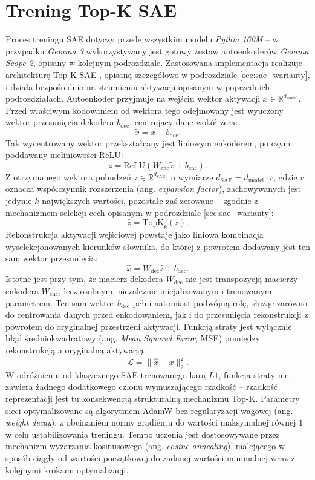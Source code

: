 \section{Trening Top-K SAE}
\label{sec:trening_topk_sae}
Proces treningu SAE dotyczy przede wszystkim modelu \textit{Pythia 160M} -- w przypadku \textit{Gemma 3} wykorzystywany jest gotowy zestaw autoenkoderów \textit{Gemma Scope 2}, opisany w kolejnym podrozdziale. Zastosowana implementacja realizuje architekturę Top-K SAE \cite{gao_2024_scaling_evaluating_sparse_autoencoders}, opisaną szczegółowo w podrozdziale \ref{sec:sae_warianty}, i działa bezpośrednio na strumieniu aktywacji opisanym w poprzednich podrozdziałach. \newline
Autoenkoder przyjmuje na wejściu wektor aktywacji $x \in \mathbb{R}^{d_{\mathrm{model}}}$. Przed właściwym kodowaniem od wektora tego odejmowany jest wyuczony wektor przesunięcia dekodera $b_{\mathrm{dec}}$, centrujący dane wokół zera:
\[
\tilde{x} = x - b_{\mathrm{dec}}.
\]
Tak wycentrowany wektor przekształcany jest liniowym enkoderem, po czym poddawany nieliniowości ReLU:
\[
z = \mathrm{ReLU}(W_{\mathrm{enc}} \tilde{x} + b_{\mathrm{enc}}).
\]
Z otrzymanego wektora pobudzeń $z \in \mathbb{R}^{d_{\mathrm{SAE}}}$, o wymiarze $d_{\mathrm{SAE}} = d_{\mathrm{model}} \cdot r$, gdzie $r$ oznacza współczynnik rozszerzenia (ang. \textit{expansion factor}), zachowywanych jest jedynie $k$ największych wartości, pozostałe zaś zerowane -- zgodnie z mechanizmem selekcji cech opisanym w podrozdziale \ref{sec:sae_warianty}:
\[
\hat{z} = \mathrm{TopK}_k(z).
\]
Rekonstrukcja aktywacji wejściowej powstaje jako liniowa kombinacja wyselekcjonowanych kierunków słownika, do której z powrotem dodawany jest ten sam wektor przesunięcia:
\[
\hat{x} = W_{\mathrm{dec}} \hat{z} + b_{\mathrm{dec}}.
\]
Istotne jest przy tym, że macierz dekodera $W_{\mathrm{dec}}$ nie jest transpozycją macierzy enkodera $W_{\mathrm{enc}}$, lecz osobnym, niezależnie inicjalizowanym i trenowanym parametrem. Ten sam wektor $b_{\mathrm{dec}}$ pełni natomiast podwójną rolę, służąc zarówno do centrowania danych przed enkodowaniem, jak i do przesunięcia rekonstrukcji z powrotem do oryginalnej przestrzeni aktywacji. \newline
Funkcją straty jest wyłącznie błąd średniokwadratowy (ang. \textit{Mean Squared Error}, MSE) pomiędzy rekonstrukcją a oryginalną aktywacją:
\[
\mathcal{L} = \lVert \hat{x} - x \rVert_2^2.
\]
W odróżnieniu od klasycznego SAE trenowanego karą $L1$, funkcja straty nie zawiera żadnego dodatkowego członu wymuszającego rzadkość -- rzadkość reprezentacji jest tu konsekwencją strukturalną mechanizmu Top-K. Parametry sieci optymalizowane są algorytmem AdamW bez regularyzacji wagowej (ang. \textit{weight decay}), z obcinaniem normy gradientu do wartości maksymalnej równej $1$ w celu ustabilizowania treningu. Tempo uczenia jest dostosowywane przez mechanizm wyżarzania kosinusowego (ang. \textit{cosine annealing}), malejącego w sposób ciągły od wartości początkowej do zadanej wartości minimalnej wraz z kolejnymi krokami optymalizacji. \newline
